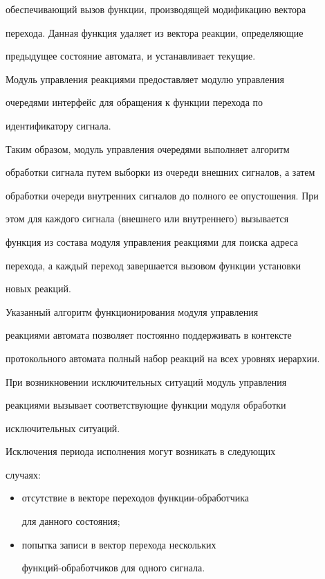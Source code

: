 обеспечивающий вызов функции, производящей модификацию вектора 


перехода. Данная функция удаляет из вектора реакции, определяющие 


предыдущее состояние автомата, и устанавливает текущие. 


      


      Модуль управления реакциями предоставляет модулю управления 


очередями интерфейс для обращения к функции перехода по 


идентификатору сигнала.


      


      Таким образом, модуль управления очередями выполняет алгоритм 


обработки сигнала путем выборки из очереди внешних сигналов, а затем 


обработки очереди внутренних сигналов до полного ее опустошения. При 


этом для каждого сигнала (внешнего или внутреннего) вызывается 


функция из состава модуля управления реакциями для поиска адреса 


перехода, а каждый переход завершается вызовом функции установки 


новых реакций.


      


      Указанный алгоритм функционирования модуля управления 


реакциями автомата позволяет постоянно поддерживать в контексте 


протокольного автомата полный набор реакций на всех уровнях иерархии. 


      


      При возникновении исключительных ситуаций модуль управления 


реакциями вызывает соответствующие функции модуля обработки 


исключительных ситуаций.


      


      Исключения периода исполнения могут возникать в следующих 


случаях:


      \begin{itemize}


      \item  отсутствие в векторе переходов функ\-ции-обра\-бот\-чи\-ка 


для данного состояния;


      \item попытка записи в вектор перехода нескольких 


      функ\-ций-обра\-бот\-чи\-ков для одного сигнала.


      \end{itemize}



